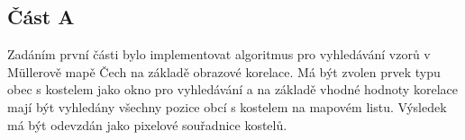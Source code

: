 \subsection*{Část A}
Zadáním první části bylo implementovat algoritmus pro vyhledávání vzorů v Müllerově mapě Čech na základě obrazové korelace. Má být zvolen prvek typu obec s kostelem jako okno pro vyhledávání a na základě vhodné hodnoty korelace mají být vyhledány všechny pozice obcí s kostelem na mapovém listu. Výsledek má být odevzdán jako pixelové souřadnice kostelů.